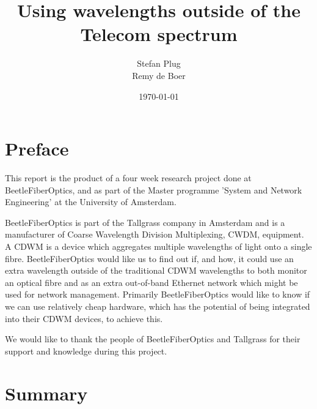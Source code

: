 \documentclass{article}
\begin{document}
\title{Using wavelengths outside of the Telecom spectrum}
\author{Stefan Plug\\Remy de Boer}
\date{\today}
\maketitle

\newpage

\section*{Preface}
This report is the product of a four week research project done at BeetleFiberOptics, and as part of the Master programme 'System and Network Engineering' at the University of Amsterdam\cite{uva:os3}.

BeetleFiberOptics is part of the Tallgrass company in Amsterdam and is a manufacturer of Coarse Wavelength Division Multiplexing, CWDM, equipment. A CDWM is a device which aggregates multiple wavelengths of light onto a single fibre. BeetleFiberOptics would like us to find out if, and how, it could use an extra wavelength outside of the traditional CDWM wavelengths to both monitor an optical fibre and as an extra out-of-band Ethernet network which might be used for network management. Primarily BeetleFiberOptics would like to know if we can use relatively cheap hardware, which has the potential of being integrated into their CDWM devices, to achieve this.

We would like to thank the people of BeetleFiberOptics and Tallgrass for their support and knowledge during this project.

\newpage
\section*{Summary}
\newpage
\tableofcontents
\newpage
\end{document}
